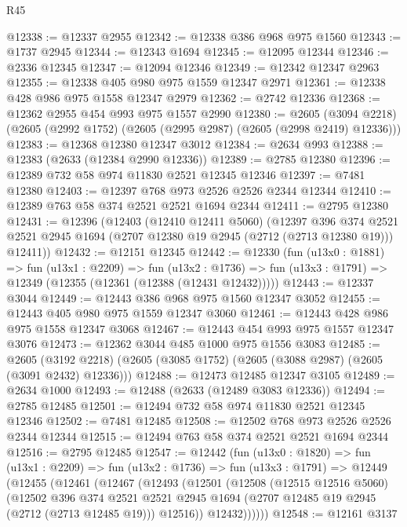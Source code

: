 \begin{lexlean}{R45}
\begin{coremodule}
@12338 := @12337 @2955
@12342 := @12338 @386 @968 @975 @1560
@12343 := @1737 @2945
@12344 := @12343 @1694
@12345 := @12095 @12344
@12346 := @2336 @12345
@12347 := @12094 @12346
@12349 := @12342 @12347 @2963
@12355 := @12338 @405 @980 @975 @1559 @12347 @2971
@12361 := @12338 @428 @986 @975 @1558 @12347 @2979
@12362 := @2742 @12336
@12368 := @12362 @2955 @454 @993 @975 @1557 @2990
@12380 := @2605
    (@3094 @2218)
    (@2605 (@2992 @1752) (@2605 (@2995 @2987) (@2605 (@2998 @2419) @12336)))
@12383 := @12368 @12380 @12347 @3012
@12384 := @2634 @993
@12388 := @12383 (@2633 (@12384 @2990 @12336))
@12389 := @2785 @12380
@12396 := @12389 @732 @58 @974 @11830 @2521 @12345 @12346
@12397 := @7481 @12380
@12403 := @12397 @768 @973 @2526 @2526 @2344 @12344
@12410 := @12389 @763 @58 @374 @2521 @2521 @1694 @2344
@12411 := @2795 @12380
@12431 := @12396
    (@12403
      (@12410 @12411 @5060)
      (@12397
        @396
        @374
        @2521
        @2521
        @2945
        @1694
        (@2707 @12380 @19 @2945 (@2712 (@2713 @12380 @19)))
        @12411))
@12432 := @12151 @12345
@12442 := @12330
    (fun (u13x0 : @1881) =>
    fun (u13x1 : @2209) =>
    fun (u13x2 : @1736) => fun (u13x3 : @1791) => @12349 (@12355 (@12361 (@12388 (@12431 @12432)))))
@12443 := @12337 @3044
@12449 := @12443 @386 @968 @975 @1560 @12347 @3052
@12455 := @12443 @405 @980 @975 @1559 @12347 @3060
@12461 := @12443 @428 @986 @975 @1558 @12347 @3068
@12467 := @12443 @454 @993 @975 @1557 @12347 @3076
@12473 := @12362 @3044 @485 @1000 @975 @1556 @3083
@12485 := @2605
    (@3192 @2218)
    (@2605 (@3085 @1752) (@2605 (@3088 @2987) (@2605 (@3091 @2432) @12336)))
@12488 := @12473 @12485 @12347 @3105
@12489 := @2634 @1000
@12493 := @12488 (@2633 (@12489 @3083 @12336))
@12494 := @2785 @12485
@12501 := @12494 @732 @58 @974 @11830 @2521 @12345 @12346
@12502 := @7481 @12485
@12508 := @12502 @768 @973 @2526 @2526 @2344 @12344
@12515 := @12494 @763 @58 @374 @2521 @2521 @1694 @2344
@12516 := @2795 @12485
@12547 := @12442
    (fun (u13x0 : @1820) =>
    fun (u13x1 : @2209) =>
    fun (u13x2 : @1736) =>
    fun (u13x3 : @1791) =>
    @12449
      (@12455
        (@12461
          (@12467
            (@12493
              (@12501
                (@12508
                  (@12515 @12516 @5060)
                  (@12502
                    @396
                    @374
                    @2521
                    @2521
                    @2945
                    @1694
                    (@2707 @12485 @19 @2945 (@2712 (@2713 @12485 @19)))
                    @12516))
                @12432))))))
@12548 := @12161 @3137

\end{coremodule}
\end{lexlean}
